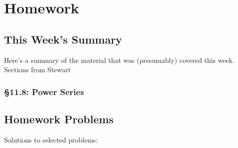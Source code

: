 \chapter{Homework}
\section{This Week's Summary}
Here's a summary of the material that was (presumably) covered this week.
Sections from Stewart
\subsection{\S 11.8: Power Series}
\section{Homework Problems}
Solutions to selected problems:

